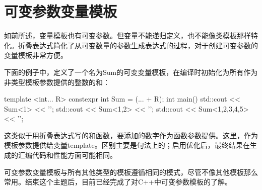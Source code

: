\section{可变参数变量模板}
如前所述，变量模板也有可变参数。但变量不能递归定义，也不能像类模板那样特化。折叠表达式简化了从可变数量的参数生成表达式的过程，对于创建可变参数的变量模板非常方便。

下面的例子中，定义了一个名为Sum的可变变量模板，在编译时初始化为所有作为非类型模板参数提供的整数的和：

\begin{cppcode}
template <int... R>
constexpr int Sum = (... + R);
int main()
{
	std::cout << Sum<1> << '\n';
	std::cout << Sum<1,2> << '\n';
	std::cout << Sum<1,2,3,4,5> << '\n';
}
\end{cppcode}

这类似于用折叠表达式写的和函数，要添加的数字作为函数参数提供。这里，作为模板参数提供给变量template。区别主要是句法上的；启用优化后，最终结果在生成的汇编代码和性能方面可能相同。

可变参数变量模板与所有其他类型的模板遵循相同的模式，尽管不像其他模板那么常用。结束这个主题后，目前已经完成了对C++中可变参数模板的了解。















































